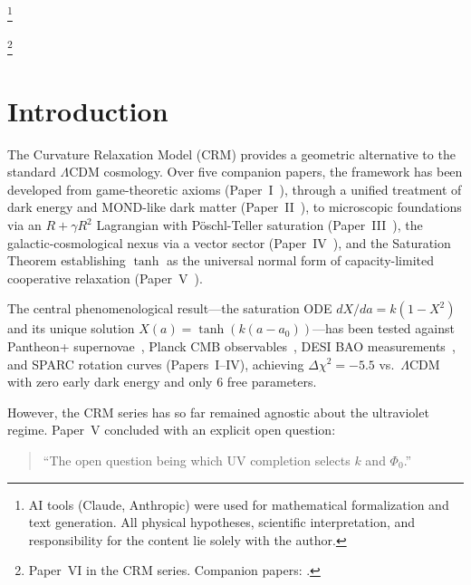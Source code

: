 \documentclass[aps,prd,twocolumn,superscriptaddress,nofootinbib]{revtex4-2}
\begin{document}

\thanks{AI tools (Claude, Anthropic) were used for mathematical formalization and text generation. All physical hypotheses, scientific interpretation, and responsibility for the content lie solely with the author.}

\thanks{Paper~VI in the CRM series. Companion papers: \cite{Geiger2026,Geiger2026b,Geiger2026c,Geiger2026d,Geiger2026e}.}

\maketitle


\section{Introduction}
\label{sec:introduction}

The Curvature Relaxation Model (CRM) provides a geometric alternative to the standard $\Lambda$CDM cosmology. Over five companion papers, the framework has been developed from game-theoretic axioms (Paper~I~\cite{Geiger2026}), through a unified treatment of dark energy and MOND-like dark matter (Paper~II~\cite{Geiger2026b}), to microscopic foundations via an $R + \gamma R^2$ Lagrangian with P\"oschl-Teller saturation (Paper~III~\cite{Geiger2026c}), the galactic-cosmological nexus via a vector sector (Paper~IV~\cite{Geiger2026d}), and the Saturation Theorem establishing $\tanh$ as the universal normal form of capacity-limited cooperative relaxation (Paper~V~\cite{Geiger2026e}).

The central phenomenological result---the saturation ODE $dX/da = k(1-X^2)$ and its unique solution $X(a) = \tanh(k(a-a_0))$---has been tested against Pantheon+ supernovae~\cite{Scolnic2022}, Planck CMB observables~\cite{Planck2020}, DESI BAO measurements~\cite{DESI2025}, and SPARC rotation curves (Papers~I--IV), achieving $\Delta\chi^2 = -5.5$ vs.\ $\Lambda$CDM with zero early dark energy and only 6 free parameters.

However, the CRM series has so far remained agnostic about the ultraviolet regime. Paper~V concluded with an explicit open question:
\begin{quote}
``The open question being which UV completion selects $k$ and $\Phi_0$.''
\end{quote}
\end{document}
